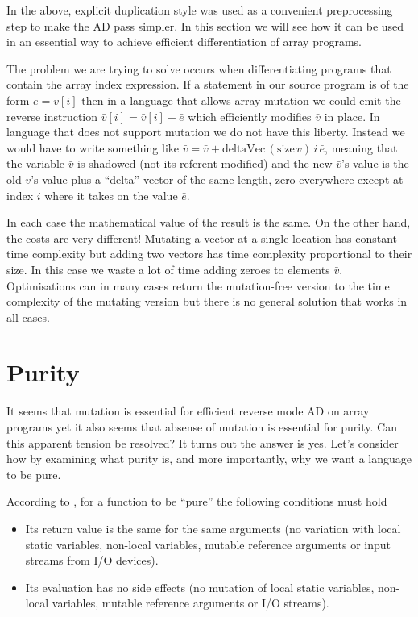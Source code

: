 \documentclass[12pt]{article}
\begin{document}
In the above, explicit duplication style was used as a convenient
preprocessing step to make the AD pass simpler.  In this section we
will see how it can be used in an essential way to achieve efficient
differentiation of array programs.

The problem we are trying to solve occurs when differentiating
programs that contain the array index expression.  If a statement in
our source program is of the form $e = v[i]$ then in a language that
allows array mutation we could emit the reverse instruction
$\bar{v}[i] = \bar{v}[i] + \bar{e}$ which efficiently modifies
$\bar{v}$ in place.  In language that does not support mutation we do
not have this liberty.  Instead we would have to write something like
$\bar{v} = \bar{v} + \textrm{deltaVec} \, (\textrm{size} \, v) \, i \,
\bar{e}$, meaning that the variable $\bar{v}$ is shadowed (not its
referent modified) and the new $\bar{v}$'s value is the old
$\bar{v}$'s value plus a ``delta'' vector of the same length, zero
everywhere except at index $i$ where it takes on the value $\bar{e}$.

In each case the mathematical value of the result is the same.  On the
other hand, the costs are very different!  Mutating a vector at a
single location has constant time complexity but adding two vectors
has time complexity proportional to their size.  In this case we waste
a lot of time adding zeroes to elements $\bar{v}$.  Optimisations can
in many cases return the mutation-free version to the time complexity
of the mutating version but there is no general solution that works in
all cases.

\section{Purity}

It seems that mutation is essential for efficient reverse mode AD on
array programs yet it also seems that absense of mutation is essential
for purity.  Can this apparent tension be resolved?  It turns out the
answer is yes.  Let's consider how by examining what purity is, and
more importantly, why we want a language to be pure.

According to \cite{purity}, for a function to be ``pure'' the
following conditions must hold

\begin{itemize}
  \item
    Its return value is the same for the same arguments (no variation
    with local static variables, non-local variables, mutable
    reference arguments or input streams from I/O devices).

  \item
    Its evaluation has no side effects (no mutation of local
    static variables, non-local variables, mutable reference
    arguments or I/O streams).
\end{itemize}
\end{document}
